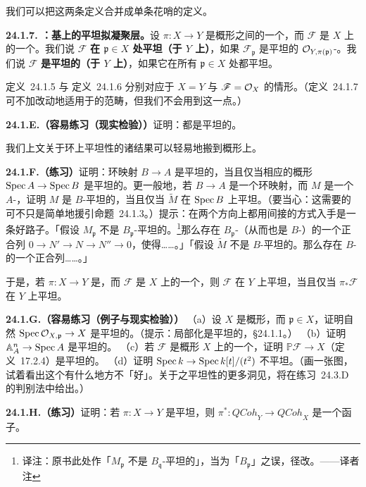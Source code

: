 我们可以把这两条定义合并成单条花哨的定义。

\textbf{24.1.7. \trhDefinition{}：基上的平坦拟凝聚层。}\quad 设 $\pi\colon X\to Y$ 是概形之间的一个\trMorphism，而 $\mathscr{F}$ 是 $X$ 上的一个\trQCSheaf。我们说 $\mathscr{F}$ \textbf{在 $\mathfrak{p}\in X$ 处平坦（于 $Y$ 上）}，如果 $\mathscr{F}_{\mathfrak{p}}$ 是平坦的 $\mathcal{O}_{Y,\pi(\mathfrak{p})}$-\trModule。我们说 $\mathscr{F}$ \textbf{是平坦的（于 $Y$ 上）}，如果它在所有 $\mathfrak{p}\in X$ 处都平坦。

\mbox{定义~24.1.5} 与 \mbox{定义~24.1.6} 分别对应于 $X=Y$ 与 $\mathscr{F}=\mathcal{O}_X$ 的情形。（\mbox{定义~24.1.7} 可不加改动地适用于\trRingedSpace{}的范畴，但我们不会用到这一点。）

\textbf{24.1.E.（容易练习（现实检验））}\quad 证明：\trOpenEmbedding{}都是平坦的。

我们上文关于环上平坦性的诸结果可以轻易地搬到概形上。

\textbf{24.1.F.（练习）}\quad 证明：环映射 $B\to A$ 是平坦的，当且仅当相应的概形\trMorphism{} $\operatorname{Spec} A\to\operatorname{Spec} B$ 是平坦的。更一般地，若 $B\to A$ 是一个环映射，而 $M$ 是一个 $A$-\trModule，证明 $M$ 是 $B$-平坦的，当且仅当 $\widetilde{M}$ 在 $\operatorname{Spec} B$ 上平坦。（要当心：这需要的可不只是简单地援引\mbox{命题~24.1.3}。）提示：在两个方向上都用间接的方式入手是一条好路子。「假设 $M_{\mathfrak{p}}$ 不是 $B_{\mathfrak{p}}$-平坦的。\footnote{译注：原书此处作「$M_{\mathfrak{p}}$ 不是 $B_{\mathfrak{q}}$-平坦的」，当为「$B_{\mathfrak{p}}$」之误，径改。——译者注}那么存在 $B_{\mathfrak{p}}$-\trModule{}（从而也是 $B$-\trModule{}）的一个正合列 $0\to N'\to N\to N''\to 0$，使得……。」「假设 $\widetilde{M}$ 不是 $B$-平坦的。那么存在 $B$-\trModule{}的一个正合列……。」

于是，若 $\pi\colon X\to Y$ 是\trAffine\trMorphism，而 $\mathscr{F}$ 是 $X$ 上的一个\trQCSheaf，则 $\mathscr{F}$ 在 $Y$ 上平坦，当且仅当 $\pi_\ast\mathscr{F}$ 在 $Y$ 上平坦。

\textbf{24.1.G.（容易练习（例子与现实检验））}\quad
（a）设 $X$ 是概形，而 $\mathfrak{p}\in X$，证明自然\trMorphism{} $\operatorname{Spec}\mathcal{O}_{X,\mathfrak{p}}\to X$ 是平坦的。（提示：局部化是平坦的，\S24.1.1。）
（b）证明 $\mathbb{A}^{n}_A\to\operatorname{Spec} A$ 是平坦的。
（c）若 $\mathscr{F}$ 是概形 $X$ 上的一个\trLocallyFreeSheaf，证明 $\mathbb{P}\mathscr{F}\to X$（\mbox{定义~17.2.4}）是平坦的。
（d）证明 $\operatorname{Spec} k\to\operatorname{Spec} k[t]/(t^{2})$ 不平坦。（画一张图，试着看出这个\trMorphism{}有什么地方不「好」。关于\trDualNumbers{}之平坦性的更多洞见，将在\mbox{练习~24.3.D} 的判别法中给出。）

\textbf{24.1.H.（练习）}\quad 证明：若 $\pi\colon X\to Y$ 是平坦\trMorphism，则 $\pi^{*}\colon\mathit{QCoh}_Y\to\mathit{QCoh}_X$ 是一个\trExact{}函子。

